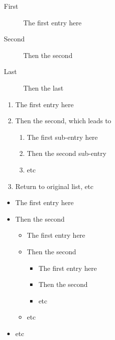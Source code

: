 \documentclass[11pt]{article}
\begin{document}
\begin{description}
\item[\color{red}First] The first entry here
\item[\color{blue}Second] Then the second
\item[\color{black}Last] Then the last
\end{description}

\begin{enumerate}[Exerc{i}se 1)]
\item The first entry here
\item Then the second, which leads to
\begin{enumerate}
\item The first sub-entry here
\item Then the second sub-entry
\item etc
\end{enumerate}
\item Return to original list, etc
\end{enumerate}

\renewcommand{\labelitemi}{\textgreater}
\renewcommand{\labelitemii}{$\star$}
\renewcommand{\labelitemiii}{$\bullet$}
\begin{itemize}
\item The first entry here
\item Then the second
\begin{itemize}
\item The first entry here
\item Then the second
\begin{itemize}
\item The first entry here
\item Then the second
\item etc
\end{itemize}
\item etc
\end{itemize}
\item etc
\end{itemize}
\end{document}
